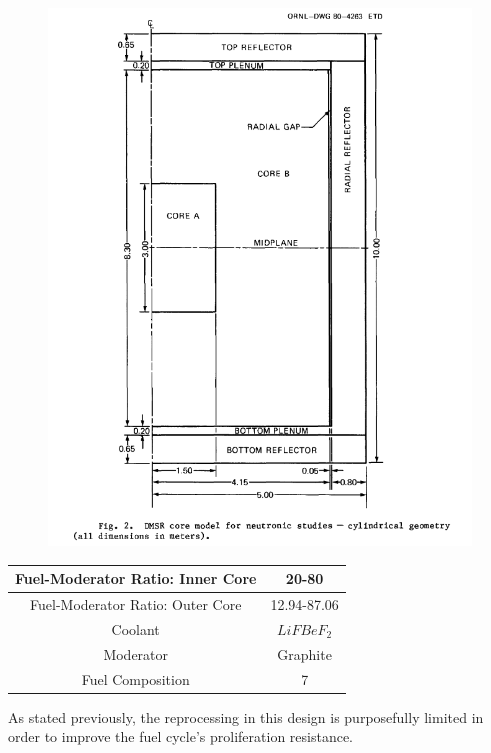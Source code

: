 \documentclass[letterpaper]{article}
\begin{document}
\begin{figure}[H]
  \centering
  \includegraphics[width=1.0\linewidth]{figures/DMSRsource1.png}
  \label{fig:fig7}
\end{figure}

\begin{center}
\begin{tabular}{|c|c|}
\hline
Fuel-Moderator Ratio: Inner Core & 20-80 \\
\hline
Fuel-Moderator Ratio: Outer Core & 12.94-87.06  \\
\hline
Coolant & $LiFBeF_2$ \\
\hline
Moderator & Graphite \\
\hline
Fuel Composition & 7 \\
\hline
\end{tabular}
\end{center}

As stated previously, the reprocessing in this design is purposefully limited in order to improve the fuel cycle's proliferation resistance.
\end{document}
